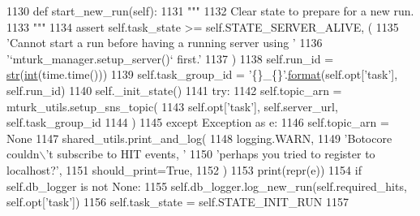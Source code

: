 \begin{DoxyCode}
1130     \textcolor{keyword}{def }start\_new\_run(self):
1131         \textcolor{stringliteral}{"""}
1132 \textcolor{stringliteral}{        Clear state to prepare for a new run.}
1133 \textcolor{stringliteral}{        """}
1134         \textcolor{keyword}{assert} self.task\_state >= self.STATE\_SERVER\_ALIVE, (
1135             \textcolor{stringliteral}{'Cannot start a run before having a running server using '}
1136             \textcolor{stringliteral}{'`mturk\_manager.setup\_server()` first.'}
1137         )
1138         self.run\_id = \hyperlink{namespacegenerate__task__READMEs_a5b88452ffb87b78c8c85ececebafc09f}{str}(\hyperlink{namespacelanguage__model_1_1eval__ppl_a7d12ee00479673c5c8d1f6d01faa272a}{int}(time.time()))
1139         self.task\_group\_id = \textcolor{stringliteral}{'\{\}\_\{\}'}.\hyperlink{namespaceparlai_1_1chat__service_1_1services_1_1messenger_1_1shared__utils_a32e2e2022b824fbaf80c747160b52a76}{format}(self.opt[\textcolor{stringliteral}{'task'}], self.run\_id)
1140         self.\_init\_state()
1141         \textcolor{keywordflow}{try}:
1142             self.topic\_arn = mturk\_utils.setup\_sns\_topic(
1143                 self.opt[\textcolor{stringliteral}{'task'}], self.server\_url, self.task\_group\_id
1144             )
1145         \textcolor{keywordflow}{except} Exception \textcolor{keyword}{as} e:
1146             self.topic\_arn = \textcolor{keywordtype}{None}
1147             shared\_utils.print\_and\_log(
1148                 logging.WARN,
1149                 \textcolor{stringliteral}{'Botocore couldn\(\backslash\)'t subscribe to HIT events, '}
1150                 \textcolor{stringliteral}{'perhaps you tried to register to localhost?'},
1151                 should\_print=\textcolor{keyword}{True},
1152             )
1153             print(repr(e))
1154         \textcolor{keywordflow}{if} self.db\_logger \textcolor{keywordflow}{is} \textcolor{keywordflow}{not} \textcolor{keywordtype}{None}:
1155             self.db\_logger.log\_new\_run(self.required\_hits, self.opt[\textcolor{stringliteral}{'task'}])
1156         self.task\_state = self.STATE\_INIT\_RUN
1157 
\end{DoxyCode}
\mbox{\label{classparlai_1_1mturk_1_1core_1_1mturk__manager_1_1MTurkManager_a30fec0658e0f98228c10ef0667519f97}} 
